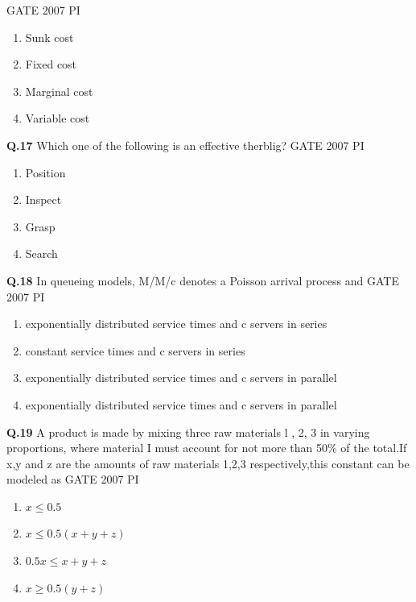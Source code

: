 \documentclass[journal,12pt,onecolumn]{exam}
\theoremstyle{remark}
\begin{document}
        \hfill{GATE 2007 PI}
        \begin{enumerate}
            \item Sunk cost
            \item Fixed cost
            \item Marginal cost
            \item Variable cost
            \end{enumerate}
            \noindent
            \textbf{Q.17}
            	Which one of the following is an effective therblig?
            \hfill{GATE 2007 PI}
            \begin{enumerate}
                \item Position
                \item Inspect
                \item Grasp
                \item Search
            \end{enumerate}
            \noindent
            \textbf{Q.18}
            In queueing models, M/M/c denotes a Poisson arrival process and
            \hfill{GATE 2007 PI}
            \begin{enumerate}
                \item 	exponentially distributed service times and c servers in series
                \item 	constant service times and c servers in series
                \item 	exponentially distributed service times and c servers in parallel
                \item 	exponentially distributed service times and c servers in parallel
            \end{enumerate}
            \noindent
            \textbf{Q.19}
            A product is made by mixing three raw materials l , 2, 3 in varying proportions, where material I must account for not more than 50\% of the total.If x,y and z are the amounts of raw materials 1,2,3 respectively,this constant can be modeled as
            \hfill{GATE 2007 PI}
            \begin{enumerate}
                \item $x \leq 0.5$
                \item $x \leq 0.5(x+y+z) $
                \item $0.5x \leq x+y+z $
                \item $x \geq 0.5(y+z) $
            \end{enumerate}
            
\end{document}
